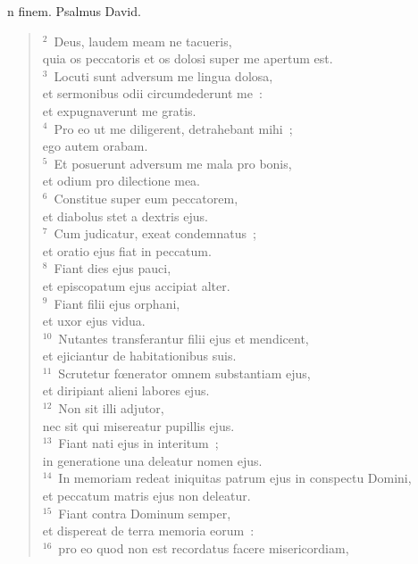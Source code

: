 \bchapter
{}n finem. Psalmus David.
\begin{flushleft}\begin{verse}\vspace{6pt}${}^{2}$~Deus, laudem meam ne tacueris,\\ quia os peccatoris et os dolosi super me apertum est.\\
${}^{3}$~Locuti sunt adversum me lingua dolosa,\\ et sermonibus odii circumdederunt me~:\\ et expugnaverunt me gratis.\\
${}^{4}$~Pro eo ut me diligerent, detrahebant mihi~;\\ ego autem orabam.\\
${}^{5}$~Et posuerunt adversum me mala pro bonis,\\ et odium pro dilectione mea.\\
${}^{6}$~Constitue super eum peccatorem,\\ et diabolus stet a dextris ejus.\\
${}^{7}$~Cum judicatur, exeat condemnatus~;\\ et oratio ejus fiat in peccatum.\\
${}^{8}$~Fiant dies ejus pauci,\\ et episcopatum ejus accipiat alter.\\
${}^{9}$~Fiant filii ejus orphani,\\ et uxor ejus vidua.\\
${}^{10}$~Nutantes transferantur filii ejus et mendicent,\\ et ejiciantur de habitationibus suis.\\
${}^{11}$~Scrutetur fœnerator omnem substantiam ejus,\\ et diripiant alieni labores ejus.\\
${}^{12}$~Non sit illi adjutor,\\ nec sit qui misereatur pupillis ejus.\\
${}^{13}$~Fiant nati ejus in interitum~;\\ in generatione una deleatur nomen ejus.\\
${}^{14}$~In memoriam redeat iniquitas patrum ejus in conspectu Domini,\\ et peccatum matris ejus non deleatur.\\
${}^{15}$~Fiant contra Dominum semper,\\ et dispereat de terra memoria eorum~:\\
${}^{16}$~pro eo quod non est recordatus facere misericordiam,\\

\end{verse}
\end{flushleft}
